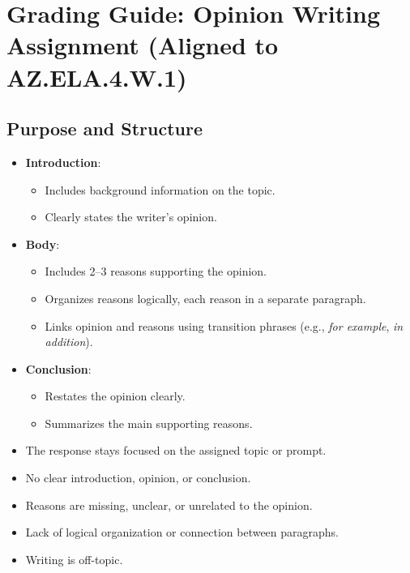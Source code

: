 \documentclass[12pt]{article}
\begin{document}
\section*{Grading Guide: Opinion Writing Assignment (Aligned to AZ.ELA.4.W.1)}

\subsection*{Purpose and Structure}
\begin{tcolorbox}[colframe=black!60, colback=white, title=Pass Criteria]
\begin{itemize}
    \item \textbf{Introduction}:
    \begin{itemize}
        \item Includes background information on the topic.
        \item Clearly states the writer's opinion.
    \end{itemize}
    \item \textbf{Body}:
    \begin{itemize}
        \item Includes 2--3 reasons supporting the opinion.
        \item Organizes reasons logically, each reason in a separate paragraph.
        \item Links opinion and reasons using transition phrases (e.g., \textit{for example}, \textit{in addition}).
    \end{itemize}
    \item \textbf{Conclusion}:
    \begin{itemize}
        \item Restates the opinion clearly.
        \item Summarizes the main supporting reasons.
    \end{itemize}
    \item The response stays focused on the assigned topic or prompt.
\end{itemize}
\end{tcolorbox}

\begin{tcolorbox}[colframe=black!60, colback=white, title=Fail Criteria]
\begin{itemize}
    \item No clear introduction, opinion, or conclusion.
    \item Reasons are missing, unclear, or unrelated to the opinion.
    \item Lack of logical organization or connection between paragraphs.
    \item Writing is off-topic.
\end{itemize}
\end{tcolorbox}
\end{document}
